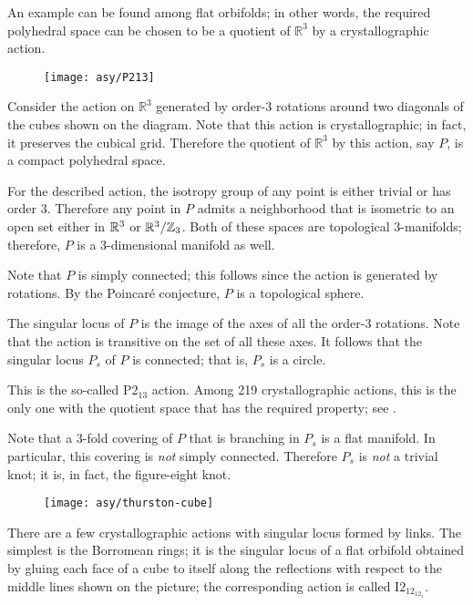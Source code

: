 An example can be found among flat orbifolds;
in other words, the required polyhedral space can be chosen to be a quotient of $\mathbb{R}^3$ by a crystallographic action.

\begin{wrapfigure}{r}{23 mm}
\vskip-4mm
\centering
\texttt{[image: asy/P213]}
\end{wrapfigure}

\medskip

Consider the action on $\mathbb{R}^3$ generated by order-3 rotations around two diagonals of the cubes shown on the diagram.
Note that this action is crystallographic;
in fact, it preserves the cubical grid.
Therefore the quotient of $\mathbb{R}^3$ by this action, say $P$, is a compact polyhedral space.

For the described action,
the isotropy group of any point is either trivial or has order 3.
Therefore any point in $P$ admits a neighborhood that is isometric to an open set either in $\mathbb{R}^3$ or $\mathbb{R}^3/\mathbb{Z}_3$.
Both of these spaces are topological 3-manifolds;
therefore, $P$ is a 3-dimensional manifold as well. 

Note that $P$ is simply connected;
this follows since the action is generated by rotations. 
By the Poincaré conjecture, $P$ is a topological sphere.

The singular locus of $P$ is the image of the axes of all the order-3 rotations.
Note that the action is transitive on the set of all these axes.
It follows that the singular locus $P_s$ of $P$ is connected; that is, $P_s$ is a circle.

\medskip

This is the so-called P$2_13$ action.
Among 219 crystallographic actions, this is the only one with the quotient space that has the required property; see \cite{dunbar}.

Note that a 3-fold covering of $P$ that is branching in $P_s$ is a flat manifold. 
In particular, this covering is \emph{not} simply connected.
Therefore $P_s$ is \emph{not} a trivial knot;
it is, in fact, the figure-eight knot.

\begin{wrapfigure}{r}{23 mm}
\vskip-4mm
\centering
\texttt{[image: asy/thurston-cube]}
\vskip-4mm
\end{wrapfigure}

There are a few crystallographic actions with singular locus formed by links. 
The simplest is the Borromean rings;
it is the singular locus of a flat orbifold obtained by gluing each face of a cube to itself
along the reflections with respect to the middle lines shown on the picture; the corresponding action is called I$2_12_12_1$. 

